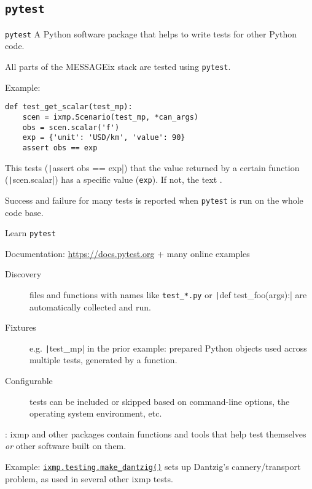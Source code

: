 \documentclass[12pt,aspectratio=169]{beamer}
\begin{document}
\subsection{\texttt{pytest}}
\begin{frame}[fragile]{\texttt{pytest}}
  A Python software package that helps to write tests for other Python code.

  All parts of the MESSAGEix stack are tested using \texttt{pytest}.

  \medskip
  Example:
  \begin{verbatim}
def test_get_scalar(test_mp):
    scen = ixmp.Scenario(test_mp, *can_args)
    obs = scen.scalar('f')
    exp = {'unit': 'USD/km', 'value': 90}
    assert obs == exp
\end{verbatim}

  This tests (\texttt|assert obs == exp|) that the value returned by a certain function (\texttt|scen.scalar|) has a specific value (\texttt{exp}).
  If not, the text .

  \medskip
  Success and failure for many tests is reported when \texttt{pytest} is run on the whole code base.

\end{frame}

\begin{frame}[fragile]{Learn \texttt{pytest}}

  Documentation: \url{https://docs.pytest.org} + many online examples

  \begin{description}
    \item [Discovery] files and functions with names like \texttt{test\_*.py} or \texttt|def test_foo(args):| are automatically collected and run.
    \item [Fixtures] e.g. \texttt|test_mp| in the prior example: prepared Python objects used across multiple tests, generated by a function.
    \item [Configurable] tests can be included or skipped based on command-line options, the operating system environment, etc.
  \end{description}

  \medskip
  : ixmp and other packages contain functions and tools that help test themselves \emph{or} other software built on them.

  \medskip
  Example: \texttt{\href{https://docs.messageix.org/projects/ixmp/en/stable/api-python.html\#ixmp.testing.make_dantzig}{ixmp.testing.make\_dantzig()}} sets up Dantzig's cannery/transport problem, as used in several other ixmp tests.
\end{frame}
\end{document}
